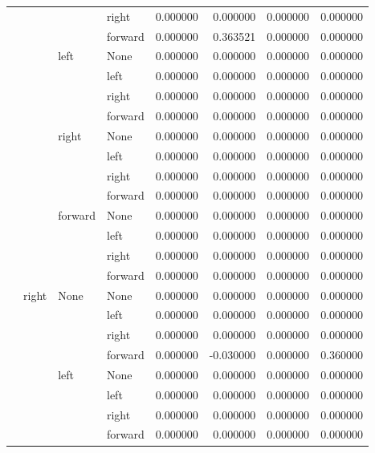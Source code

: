 \documentclass{article}
\begin{document}
\begin{longtable}{llllrrrr}
      &      &      & right &  0.000000 &  0.000000 &  0.000000 &  0.000000 \\
      &      &      & forward &  0.000000 &  0.363521 &  0.000000 &  0.000000 \\
      &      & left & None &  0.000000 &  0.000000 &  0.000000 &  0.000000 \\
      &      &      & left &  0.000000 &  0.000000 &  0.000000 &  0.000000 \\
      &      &      & right &  0.000000 &  0.000000 &  0.000000 &  0.000000 \\
      &      &      & forward &  0.000000 &  0.000000 &  0.000000 &  0.000000 \\
      &      & right & None &  0.000000 &  0.000000 &  0.000000 &  0.000000 \\
      &      &      & left &  0.000000 &  0.000000 &  0.000000 &  0.000000 \\
      &      &      & right &  0.000000 &  0.000000 &  0.000000 &  0.000000 \\
      &      &      & forward &  0.000000 &  0.000000 &  0.000000 &  0.000000 \\
      &      & forward & None &  0.000000 &  0.000000 &  0.000000 &  0.000000 \\
      &      &      & left &  0.000000 &  0.000000 &  0.000000 &  0.000000 \\
      &      &      & right &  0.000000 &  0.000000 &  0.000000 &  0.000000 \\
      &      &      & forward &  0.000000 &  0.000000 &  0.000000 &  0.000000 \\
      & right & None & None &  0.000000 &  0.000000 &  0.000000 &  0.000000 \\
      &      &      & left &  0.000000 &  0.000000 &  0.000000 &  0.000000 \\
      &      &      & right &  0.000000 &  0.000000 &  0.000000 &  0.000000 \\
      &      &      & forward &  0.000000 & -0.030000 &  0.000000 &  0.360000 \\
      &      & left & None &  0.000000 &  0.000000 &  0.000000 &  0.000000 \\
      &      &      & left &  0.000000 &  0.000000 &  0.000000 &  0.000000 \\
      &      &      & right &  0.000000 &  0.000000 &  0.000000 &  0.000000 \\
      &      &      & forward &  0.000000 &  0.000000 &  0.000000 &  0.000000 \\

\end{longtable}
\end{document}
